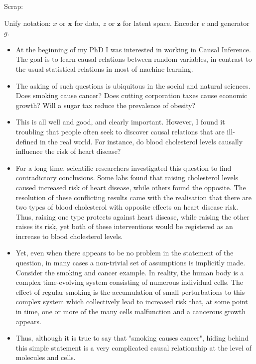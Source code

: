 Scrap:

Unify notation: $x$ or $\mathbf{x}$ for data, $z$ or $\mathbf{z}$ for latent space. Encoder $e$ and generator $g$. 

\begin{itemize}
\item At the beginning of my PhD I was interested in working in Causal Inference. The goal is to learn causal relations between random variables, in contrast to the usual statistical relations in most of machine learning. 
\item The asking of such questions is ubiquitous in the social and natural sciences. Does smoking cause cancer? Does cutting corporation taxes cause economic growth? Will a sugar tax reduce the prevalence of obesity?
\item This is all well and good, and clearly important. However, I found it troubling that people often seek to discover causal relations that are ill-defined in the real world. For instance, do blood cholesterol levels causally influence the risk of heart disease? 
\item For a long time, scientific researchers investigated this question to find contradictory conclusions. Some labs found that raising cholesterol levels caused increased risk of heart disease, while others found the opposite. The resolution of these conflicting results came with the realisation that there are two types of blood cholesterol with opposite effects on heart disease risk. Thus, raising one type protects against heart disease, while raising the other raises its risk, yet both of these interventions would be registered as an increase to blood cholesterol levels.
\item Yet, even when there appears to be no problem in the statement of the question, in many cases a non-trivial set of assumptions is implicitly made. Consider the smoking and cancer example. In reality, the human body is a complex time-evolving system consisting of numerous individual cells. The effect of regular smoking is the accumulation of small perturbations to this complex system which collectively lead to increased risk that, at some point in time, one or more of the many cells malfunction and a cancerous growth appears. 
\item Thus, although it is true to say that "smoking causes cancer", hiding behind this simple statement is a very complicated causal relationship at the level of molecules and cells.

\end{itemize}
